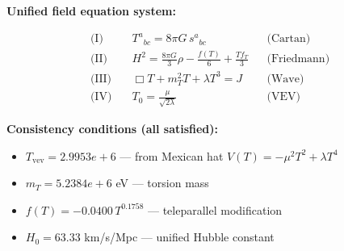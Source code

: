 
\textbf{Unified field equation system:}

\begin{align}
  \text{(I)} \quad & T^a{}_{bc} = 8\pi G \, s^a{}_{bc} && \text{(Cartan)} \\
  \text{(II)} \quad & H^2 = \frac{8\pi G}{3}\rho - \frac{f(T)}{6} + \frac{Tf_T}{3} && \text{(Friedmann)} \\
  \text{(III)} \quad & \Box T + m_T^2 T + \lambda T^3 = J && \text{(Wave)} \\
  \text{(IV)} \quad & T_0 = \frac{\mu}{\sqrt{2\lambda}} && \text{(VEV)}
\end{align}

\textbf{Consistency conditions (all satisfied):}
\begin{itemize}
  \item $T_{\text{vev}} = 2.9953e+6$ — from Mexican hat $V(T) = -\mu^2 T^2 + \lambda T^4$
  \item $m_T = 5.2384e+6$ eV — torsion mass
  \item $f(T) = -0.0400 \, T^{0.1758}$ — teleparallel modification
  \item $H_0 = 63.33$ km/s/Mpc — unified Hubble constant
\end{itemize}